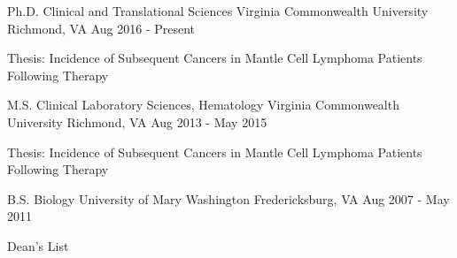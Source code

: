 

\begin{cventries}

\cventry
{Ph.D. Clinical and Translational Sciences} %
{Virginia Commonwealth University} %
{Richmond, VA} %
{Aug 2016 - Present} %
{
  \begin{cvitems} %
    \item {Thesis: Incidence of Subsequent Cancers in Mantle Cell Lymphoma Patients Following Therapy}
  \end{cvitems}
}

\cventry
{M.S. Clinical Laboratory Sciences, Hematology} %
{Virginia Commonwealth University} %
{Richmond, VA} %
{Aug 2013 - May 2015} %
{
  \begin{cvitems} %
    \item {Thesis: Incidence of Subsequent Cancers in Mantle Cell Lymphoma Patients Following Therapy}
  \end{cvitems}
}

  \cventry
    {B.S. Biology} %
    {University of Mary Washington} %
    {Fredericksburg, VA} %
    {Aug 2007 - May 2011} %
    {
      \begin{cvitems} %
        \item {Dean's List}
      \end{cvitems}
    }


\end{cventries}
